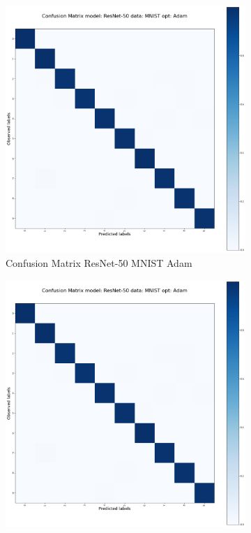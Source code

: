\documentclass[conference]{IEEEtran}
\begin{document}
\begin{figure}[!htbp]
    \centering
    \begin{subfigure}[b]{0.22\textwidth}
        \centering
        \includegraphics[width=\textwidth]{img/matrix_resnet_MNIST_Adam.png}
        \caption{Confusion Matrix ResNet-50 MNIST Adam}
        \label{fig:x imatrix_ResNet_MNIST_Adam}
    \end{subfigure}
    \hfill
    \begin{subfigure}[b]{0.22\textwidth}
        \centering
        \includegraphics[width=\textwidth]{img/matrix_resnet_MNIST_Adam.png}

\end{subfigure}
\end{figure}
\end{document}
